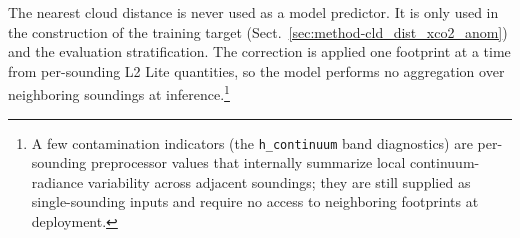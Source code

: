 The nearest cloud distance is never used as a model predictor. It is only used in the construction of the training target (Sect.~\ref{sec:method-cld_dist_xco2_anom}) and the evaluation stratification. The correction is applied one footprint at a time from per-sounding L2 Lite quantities, so the model performs no aggregation over neighboring soundings at inference.\footnote{A few contamination indicators (the \texttt{h\_continuum}
band diagnostics) are per-sounding preprocessor values that internally summarize local continuum-radiance variability across adjacent soundings; they are still supplied as single-sounding inputs and require no access to neighboring footprints at deployment.}


